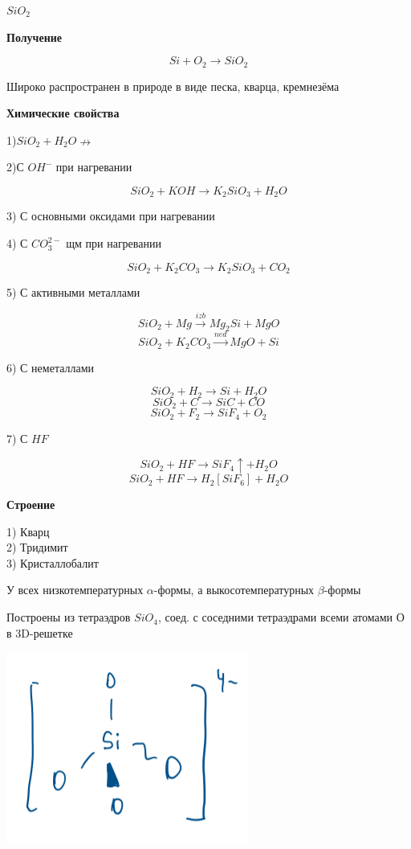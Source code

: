$SiO_2$

\textbf{Получение}

$$Si + O_2 \rightarrow SiO_2$$

Широко распространен в природе в виде песка, кварца, кремнезёма

\textbf{Химические свойства}

1)$SiO_2 + H_2O \nrightarrow$

2)С $OH^-$ при нагревании

$$SiO_2 + KOH \rightarrow K_2SiO_3 + H_2O$$

3) С основными оксидами при нагревании

4) С $CO_3^{2-}$ щм при нагревании

$$SiO_2 + K_2CO_3 \rightarrow K_2SiO_3 + CO_2$$

5) С активными металлами

$$SiO_2 + Mg \xrightarrow{izb} Mg_2Si + MgO$$
$$SiO_2 + K_2CO_3 \xrightarrow{ned} MgO + Si$$

6) С неметаллами

$$SiO_2 + H_2 \rightarrow Si + H_2O$$
$$SiO_2 + C \rightarrow SiC + CO$$
$$SiO_2 + F_2 \rightarrow SiF_4+ O_2$$

7) С $HF$

$$SiO_2 + HF \rightarrow SiF_4\uparrow + H_2O$$
$$SiO_2 + HF \rightarrow H_2[SiF_6] + H_2O$$

\textbf{Строение}

1) Кварц\\
2) Тридимит\\
3) Кристаллобалит

У всех низкотемпературных $\alpha$-формы, а выкосотемпературных $\beta$-формы

Построены из тетраэдров $SiO_4$, соед. с соседними тетраэдрами всеми атомами О в 3D-решетке

\includegraphics{images/10v6.png}\\

